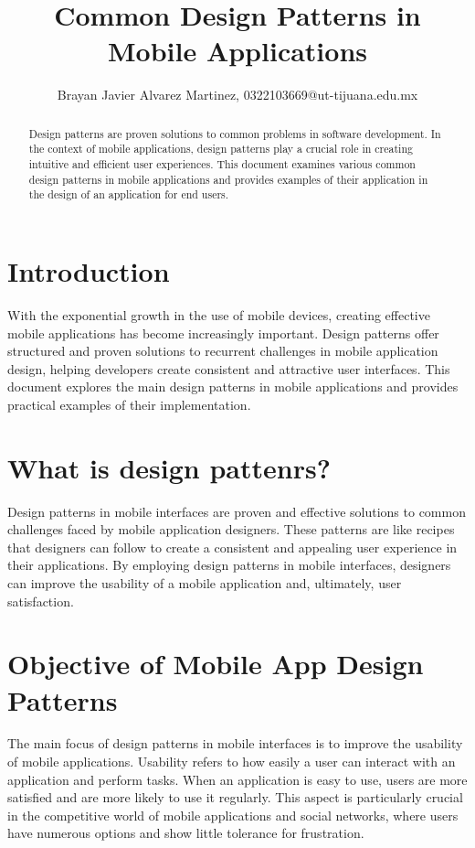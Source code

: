 \documentclass[conference]{IEEEtran}
\begin{document}
\title{Common Design Patterns in Mobile Applications}

\author{Brayan Javier Alvarez Martinez, 
0322103669@ut-tijuana.edu.mx}
\maketitle

\begin{abstract}
Design patterns are proven solutions to common problems in software development. In the context of mobile applications, design patterns play a crucial role in creating intuitive and efficient user experiences. This document examines various common design patterns in mobile applications and provides examples of their application in the design of an application for end users.
\end{abstract}

\section{Introduction}
With the exponential growth in the use of mobile devices, creating effective mobile applications has become increasingly important. Design patterns offer structured and proven solutions to recurrent challenges in mobile application design, helping developers create consistent and attractive user interfaces. This document explores the main design patterns in mobile applications and provides practical examples of their implementation.

\section{What is design pattenrs?}
Design patterns in mobile interfaces are proven and effective solutions to common challenges faced by mobile application designers. These patterns are like recipes that designers can follow to create a consistent and appealing user experience in their applications. By employing design patterns in mobile interfaces, designers can improve the usability of a mobile application and, ultimately, user satisfaction.
\section{Objective of Mobile App Design Patterns}
The main focus of design patterns in mobile interfaces is to improve the usability of mobile applications. Usability refers to how easily a user can interact with an application and perform tasks. When an application is easy to use, users are more satisfied and are more likely to use it regularly. This aspect is particularly crucial in the competitive world of mobile applications and social networks, where users have numerous options and show little tolerance for frustration.
\end{document}
